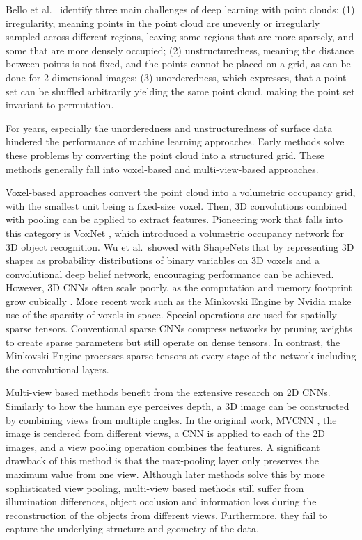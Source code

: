 \documentclass[class=article, crop=false]{standalone}
\begin{document}
Bello et al.\ \cite{Bello2020} identify three main challenges of deep learning with point clouds: (1) irregularity, meaning points in the point cloud are unevenly or irregularly sampled across different regions, leaving some regions that are more sparsely, and some that are more densely occupied; (2) unstructuredness, meaning the distance between points is not fixed, and the points cannot be placed on a grid, as can be done for 2-dimensional images; (3) unorderedness, which expresses, that a point set can be shuffled arbitrarily yielding the same point cloud, making the point set invariant to permutation.

For years, especially the unorderedness and unstructuredness of surface data hindered the performance of machine learning approaches. Early methods solve these problems by converting the point cloud into a structured grid. These methods generally fall into voxel-based and multi-view-based approaches.

Voxel-based approaches convert the point cloud into a volumetric occupancy grid, with the smallest unit being a fixed-size voxel. Then, 3D convolutions combined with pooling can be applied to extract features. Pioneering work that falls into this category is VoxNet \cite{Maturana2015}, which introduced a volumetric occupancy network for 3D object recognition. Wu et al.\ showed with ShapeNets \cite{Wu2015} that by representing 3D shapes as probability distributions of binary variables on 3D voxels and a convolutional deep belief network, encouraging performance can be achieved. However, 3D CNNs often scale poorly, as the computation and memory footprint grow cubically \cite{Guo2021}. More recent work such as the Minkovski Engine \cite{DBLP:journals/corr/abs-1904-08755} by Nvidia make use of the sparsity of voxels in space. Special operations are used for spatially sparse tensors. Conventional sparse CNNs compress networks by pruning weights to create sparse parameters but still operate on dense tensors. In contrast, the Minkovski Engine processes sparse tensors at every stage of the network including the convolutional layers.

Multi-view based methods benefit from the extensive research on 2D CNNs. Similarly to how the human eye perceives depth, a 3D image can be constructed by combining views from multiple angles. In the original work, MVCNN \cite{mvcnn}, the image is rendered from different views, a CNN is applied to each of the 2D images, and a view pooling operation combines the features. A significant drawback of this method is that the max-pooling layer only preserves the maximum value from one view. Although later methods solve this by more sophisticated view pooling, multi-view based methods still suffer from illumination differences, object occlusion and information loss during the reconstruction of the objects from different views. Furthermore, they fail to capture the underlying structure and geometry of the data.
\end{document}

